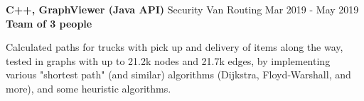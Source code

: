 \cventry
  {\textbf{C++, GraphViewer (Java API)}}
  {Security Van Routing \href{https://github.com/EduRibeiro00/SecurityVanRouting-feup-cal}{\faExternalLink}} %
  {Mar 2019 - May 2019}
  {\textbf{Team of 3 people}}
  {
    \begin{cvitems} %
      \item {Calculated paths for trucks with pick up and delivery of items along the way, tested in graphs with up to 21.2k nodes and 21.7k edges, by implementing various "shortest path" (and similar) algorithms (Dijkstra, Floyd‐Warshall, and more), and some heuristic algorithms.}
    \end{cvitems}
  }